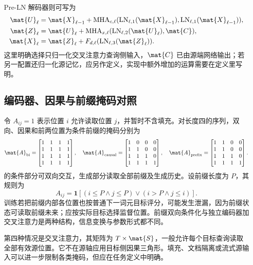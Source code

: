 \documentclass[../textbook.tex]{subfiles}
\begin{document}
Pre-LN 解码器则可写为
\begin{align}
 \mat{U}_\ell&=\mat{X}_{\ell-1}+\operatorname{MHA}_{c,\ell}
 (\operatorname{LN}_{\ell,1}(\mat{X}_{\ell-1}),\operatorname{LN}_{\ell,1}(\mat{X}_{\ell-1})),\\
 \mat{Z}_\ell&=\mat{U}_\ell+\operatorname{MHA}_{x,\ell}(\operatorname{LN}_{\ell,2}(\mat{U}_\ell),\mat{C}),\\
 \mat{X}_\ell&=\mat{Z}_\ell+F_{d,\ell}(\operatorname{LN}_{\ell,3}(\mat{Z}_\ell)).
\end{align}
这里明确选择只归一化交叉注意力查询侧输入，$\mat{C}$ 已由源端网络输出；若另一配置还归一化源记忆，应另作定义，实现中额外增加的运算需要在定义里写明。

\subsection{编码器、因果与前缀掩码对照}
令 $A_{ij}=1$ 表示位置 $i$ 允许读取位置 $j$，并暂时不含填充。对长度四的序列，双向、因果和前两位置为条件前缀的掩码分别为
\begin{equation}
 \mat{A}_{\mathrm{bi}}=\begin{bmatrix}1&1&1&1\\1&1&1&1\\1&1&1&1\\1&1&1&1\end{bmatrix},\quad
 \mat{A}_{\mathrm{causal}}=\begin{bmatrix}1&0&0&0\\1&1&0&0\\1&1&1&0\\1&1&1&1\end{bmatrix},\quad
 \mat{A}_{\mathrm{prefix}}=\begin{bmatrix}1&1&0&0\\1&1&0&0\\1&1&1&0\\1&1&1&1\end{bmatrix}.
\end{equation}
的条件部分可双向交互，生成部分读取全部前缀及生成历史。设前缀长度为 $P$，其规则为
\begin{equation}
 A_{ij}=\mathbf1[(i\le P\land j\le P)\lor(i>P\land j\le i)].
\end{equation}
训练若把前缀内部各位置也按普通下一词元目标评分，可能发生泄漏，因为前缀状态可读取前缀未来；应按实际目标选择监督位置。前缀双向条件化与独立编码器加交叉注意力是两种结构，信息变换与参数形式都不同。

第四种情况是交叉注意力，其矩阵为 $T\times \mat{S}$，一般允许每个目标查询读取全部有效源位置。它不在源轴应用目标侧因果三角形。填充、文档隔离或流式源输入可以进一步限制各类掩码，但应在任务定义中明确。
\end{document}
